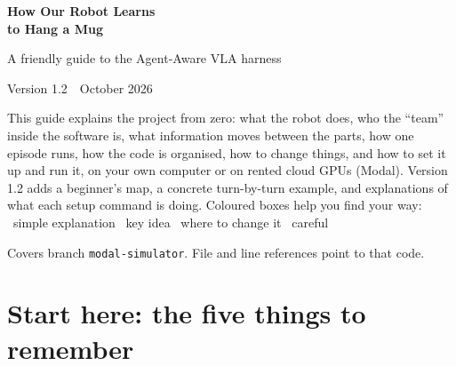 \documentclass[11pt,a4paper]{article}
\newcommand{\robotscene}{%
  \fill[sun!25] (-4,-0.2) rectangle (4,0);
  \draw[sun!70!black,thick] (-4,0) -- (4,0);
  \draw[sun!70!black,thick] (-3.6,-0.2) -- (-3.6,-1.6) (3.6,-0.2) -- (3.6,-1.6);
  \fill[sky!70] (-1.7,0) rectangle (-1.1,0.7);
  \draw[sky!80!black,line width=2pt] (-1.1,0.5) arc (90:-90:0.18 and 0.17);
  \node[font=\scriptsize] at (-1.4,-0.45) {mug};
  \fill[stone] (1.7,0) rectangle (2.5,0.12);
  \draw[stone,line width=3pt] (2.1,0.1) -- (2.1,2.3);
  \draw[stone,line width=2pt] (2.1,1.7) -- (1.6,2.05) (2.1,1.3) -- (2.6,1.6);
  \node[font=\scriptsize] at (2.1,-0.45) {rack with pegs};
  \draw[ink,line width=4pt,line cap=round] (-3.8,3.2) -- (-3.0,2.4) -- (-2.0,1.6);
  \fill[ink] (-3.8,3.2) circle (0.14) (-3.0,2.4) circle (0.12) (-2.0,1.6) circle (0.10);
  \draw[ink,line width=2pt] (-2.0,1.6) -- (-1.75,1.25) (-2.0,1.6) -- (-1.55,1.45);
  \node[font=\scriptsize,align=center] at (-3.6,3.65) {left arm};
  \draw[ink,line width=4pt,line cap=round] (3.8,3.2) -- (3.0,2.6) -- (2.2,2.9);
  \fill[ink] (3.8,3.2) circle (0.14) (3.0,2.6) circle (0.12) (2.2,2.9) circle (0.10);
  \draw[ink,line width=2pt] (2.2,2.9) -- (1.95,2.65) (2.2,2.9) -- (1.9,2.95);
  \node[font=\scriptsize] at (3.6,3.65) {right arm};
  \fill[grape] (-0.25,3.6) rectangle (0.25,3.9);
  \fill[grape] (-0.08,3.6) -- (0.08,3.6) -- (0,3.45) -- cycle;
  \draw[grape!60,dashed] (0,3.45) -- (-1.6,0.8) (0,3.45) -- (2.1,1.0);
  \node[font=\scriptsize,text=grape] at (0,4.15) {head camera};
}
\begin{document}
\begin{titlepage}
\centering
\vspace*{1.2cm}
{\color{sky}\fontsize{30}{36}\selectfont\bfseries How Our Robot Learns\\[4pt] to Hang a Mug\par}
\vspace{0.4cm}
{\Large\color{stone} A friendly guide to the Agent-Aware VLA harness\par}
\vspace{0.2cm}
{\large\color{stone} Version 1.2 \,\textbullet\, October 2026\par}
\vspace{1.2cm}
\vspace{1.0cm}

\begin{tcolorbox}[enhanced,colback=skylight,colframe=sky,arc=3mm,width=0.86\textwidth,boxrule=0.8pt]
\centering\small
This guide explains the project from zero: what the robot does, who the ``team'' inside the
software is, what information moves between the parts, how one episode runs, how the code is
organised, how to change things, and how to set it up and run it, on your own computer or on
rented cloud GPUs (Modal). Version 1.2 adds a beginner's map, a concrete turn-by-turn example,
and explanations of what each setup command is doing. Coloured boxes help you find your way:\\[6pt]
\colorbox{sunlight}{\faChild\ simple explanation}\quad
\colorbox{skylight}{\faLightbulb\ key idea}\quad
\colorbox{leaflight}{\faWrench\ where to change it}\quad
\colorbox{roselight}{\faExclamationTriangle\ careful}
\end{tcolorbox}
\vfill
{\small\color{stone} Covers branch \texttt{modal-simulator}. File and line references point to that code.}
\end{titlepage}

{\small\tableofcontents}
\newpage

\section*{Start here: the five things to remember}
\end{document}
